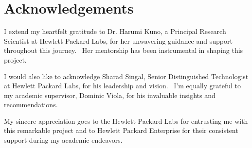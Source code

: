 \chapter*{Acknowledgements}
\label{Acknowledgements}


I extend my heartfelt gratitude to Dr. Harumi Kuno, a Principal Research Scientist at Hewlett Packard Labs, for her unwavering guidance and support throughout this journey. \
Her mentorship has been instrumental in shaping this project.

I would also like to acknowledge Sharad Singal, Senior Distinguished Technologist at Hewlett Packard Labs, for his leadership and vision. \
I'm equally grateful to my academic supervisor, Dominic Viola, for his invaluable insights and recommendations.

My sincere appreciation goes to the Hewlett Packard Labs for entrusting me with this remarkable project
and to Hewlett Packard Enterprise for their consistent support during my academic endeavors.
